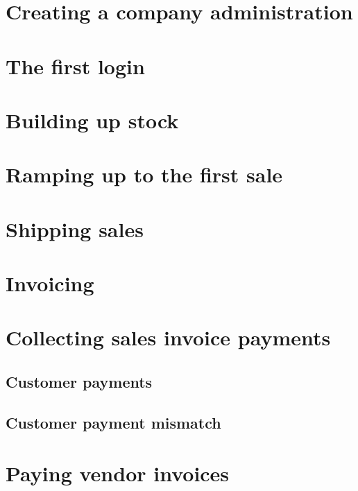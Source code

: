\chapter{Creating a company administration}
\label{cha:CompanyCreation}



\chapter{The first login}

\chapter{Building up stock}

\chapter{Ramping up to the first sale}


\chapter{Shipping sales}

\chapter{Invoicing}

\chapter{Collecting sales invoice payments}

\section{Customer payments}

\section{Customer payment mismatch}





\chapter{Paying vendor invoices}

